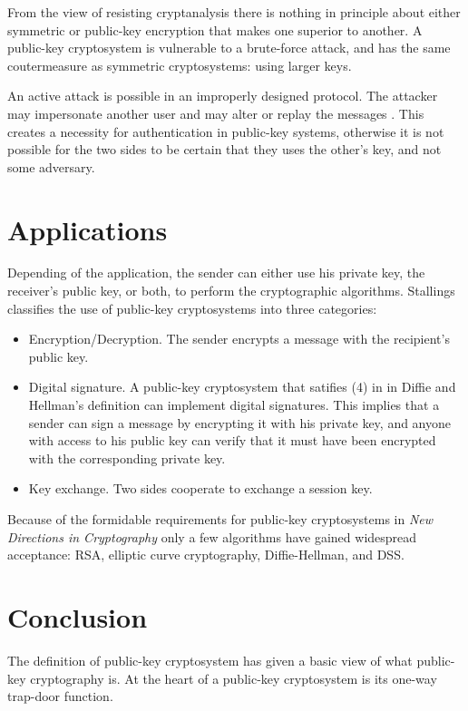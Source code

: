\documentclass[english,titlepage,11pt]{article}
\begin{document}
From the view of resisting cryptanalysis there is nothing in principle about either symmetric or public-key encryption that makes one superior to another\cite{stallings06}. A public-key cryptosystem is vulnerable to a brute-force attack, and has the same coutermeasure as symmetric cryptosystems: using larger keys.

An active attack is possible in an improperly designed protocol. The attacker may impersonate another user and may alter or replay the messages \cite{dolev83,menezes01}. This creates a necessity for authentication in public-key systems, otherwise it is not possible for the two sides to be certain that they uses the other's key, and not some adversary.

\section{Applications}

Depending of the application, the sender can either use his private key, the receiver's public key, or both, to perform the cryptographic algorithms. Stallings classifies the use of public-key cryptosystems into three categories\cite{stallings06}:

\begin{itemize}
  \item Encryption/Decryption. The sender encrypts a message with the recipient's public key.
  \item Digital signature. A public-key cryptosystem that satifies (4) in in Diffie and Hellman's definition can implement digital signatures\cite{diffie76,rsa78}. This implies that a sender can sign a message by encrypting it with his private key, and anyone with access to his public key can verify that it must have been encrypted with the corresponding private key.
  \item Key exchange. Two sides cooperate to exchange a session key. 
\end{itemize}

Because of the formidable requirements for public-key cryptosystems in \emph{New Directions in Cryptography}\cite{diffie76} only a few algorithms have gained widespread acceptance\cite{stallings06}: RSA, elliptic curve cryptography, Diffie-Hellman, and DSS.

\section{Conclusion}

The definition of public-key cryptosystem has given a basic view of what public-key cryptography is. At the heart of a public-key cryptosystem is its one-way trap-door function. 
\end{document}
